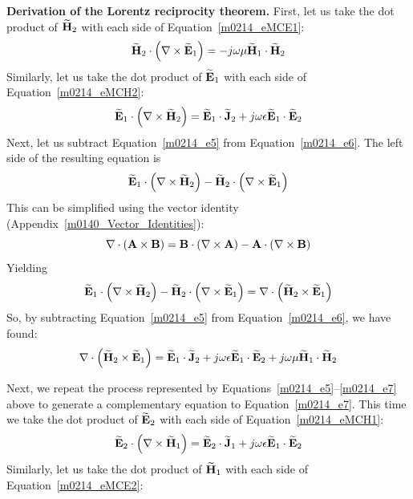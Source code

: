 {\bf Derivation of the Lorentz reciprocity theorem.}
First, let us take the dot product of $\widetilde{\bf H}_2$ with each side of Equation~\ref{m0214_eMCE1}:
%
\begin{equation}
\widetilde{\bf H}_2 \cdot \left( \nabla \times  \widetilde{\bf E}_1 \right) = -j\omega\mu\widetilde{\bf H}_1 \cdot \widetilde{\bf H}_2 
\label{m0214_e5}
\end{equation}
%
Similarly, let us take the dot product of $\widetilde{\bf E}_1$ with each side of Equation~\ref{m0214_eMCH2}:
%
\begin{equation}
\widetilde{\bf E}_1 \cdot \left( \nabla \times  \widetilde{\bf H}_2 \right) = \widetilde{\bf E}_1 \cdot \widetilde{\bf J}_2 +j\omega\epsilon\widetilde{\bf E}_1 \cdot \widetilde{\bf E}_2 
\label{m0214_e6}
\end{equation}
%
Next, let us subtract Equation~\ref{m0214_e5} from Equation~\ref{m0214_e6}.  
The left side of the resulting equation is 
%
\begin{equation}
\widetilde{\bf E}_1 \cdot \left( \nabla \times  \widetilde{\bf H}_2 \right) - \widetilde{\bf H}_2 \cdot \left( \nabla \times  \widetilde{\bf E}_1 \right)
\end{equation}
%
This can be simplified using the vector identity (Appendix~\ref{m0140_Vector_Identities}):
%
\begin{equation}
\nabla \cdot \left({\bf A}\times {\bf B}\right) = {\bf B}\cdot\left(\nabla \times{\bf A}\right)-{\bf A}\cdot\left(\nabla \times{\bf B}\right) 
\end{equation}
%
Yielding
%
\begin{equation}
\widetilde{\bf E}_1 \cdot \left( \nabla \times  \widetilde{\bf H}_2 \right) - \widetilde{\bf H}_2 \cdot \left( \nabla \times  \widetilde{\bf E}_1 \right) = \nabla \cdot \left(\widetilde{\bf H}_2 \times \widetilde{\bf E}_1 \right)
\end{equation}
%
So, by subtracting Equation~\ref{m0214_e5} from Equation~\ref{m0214_e6}, we have found:
%
\begin{equation}
\nabla \cdot \left(\widetilde{\bf H}_2 \times \widetilde{\bf E}_1 \right)
= \widetilde{\bf E}_1 \cdot \widetilde{\bf J}_2 
+j\omega\epsilon\widetilde{\bf E}_1 \cdot \widetilde{\bf E}_2 
+j\omega\mu     \widetilde{\bf H}_1 \cdot \widetilde{\bf H}_2
\label{m0214_e7}
\end{equation}
 
Next, we repeat the process represented by Equations~\ref{m0214_e5}--\ref{m0214_e7} above to generate a complementary equation to Equation~\ref{m0214_e7}.
This time we take the dot product of $\widetilde{\bf E}_2$ with each side of Equation~\ref{m0214_eMCH1}:
%
\begin{equation}
\widetilde{\bf E}_2 \cdot \left( \nabla \times  \widetilde{\bf H}_1 \right) = \widetilde{\bf E}_2 \cdot \widetilde{\bf J}_1 +j\omega\epsilon\widetilde{\bf E}_1 \cdot \widetilde{\bf E}_2 
\label{m0214_e8}
\end{equation}
%
Similarly, let us take the dot product of $\widetilde{\bf H}_1$ with each side of Equation~\ref{m0214_eMCE2}:

